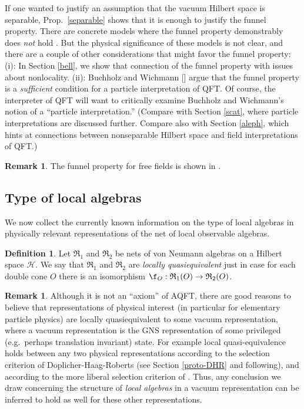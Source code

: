 \documentclass[12pt]{article}
\newcommand{\alg}[1]{\mathfrak{#1}}
\theoremstyle{definition}
\theoremstyle{definition}
\newtheorem{defn}[thm]{Definition}
\newtheorem{note}[thm]{Remark}
\theoremstyle{remark}
\def\2#1{{\mathcal #1}}
\begin{document}
If one wanted to justify an assumption that the vacuum
Hilbert space is separable, Prop.\ \ref{separable}
shows that it is enough to justify the funnel property.
There are concrete models where the funnel property
demonstrably does \emph{not} hold \cite[p.\
23]{horuzhy}.  But the physical significance of these
models is not clear, and there are a couple of other
considerations that might favor the funnel property:
(i): In Section \ref{bell}, we show that connection of
the funnel property with issues about nonlocality.
(ii): Buchholz and Wichmann [\citeyear{bucwic}] argue
that the funnel property is a \emph{sufficient}
condition for a particle interpretation of QFT.  Of
course, the interpreter of QFT will want to critically
examine Buchholz and Wichmann's notion of a ``particle
interpretation.'' (Compare with Section \ref{scat},
where particle interpretations are discussed further.
Compare also with Section \ref{aleph}, which hints at
connections between nonseparable Hilbert space and
field interpretations of QFT.)


\begin{note} The funnel property for free fields is shown in
  \cite{pstates}.
\end{note}


\subsection{Type of local algebras} \label{type-loc}

We now collect the currently known information on the type of local algebras in
physically relevant representations of the net of local observable algebras.

\begin{defn} Let $\alg{R}_1$ and $\alg{R}_2$ be nets of von Neumann algebras on a
  Hilbert space $\2H$.  We say that $\alg{R}_1$ and $\alg{R}_2$ are \emph{locally
    quasiequivalent} just in case for each double cone $O$ there is an isomorphism
  $\f _O:\alg{R}_1(O)\to \alg{R}_2(O)$.  \end{defn}

\begin{note} Although it is not an ``axiom'' of AQFT, there are good
  reasons to believe that representations of physical interest (in
  particular for elementary particle physics) are locally
  quasiequivalent to some vacuum representation, where a vacuum
  representation is the GNS representation of some privileged (e.g.\
  perhaps translation invariant) state.  For example local
  quasi-equivalence holds between any two physical representations
  according to the selection criterion of Doplicher-Haag-Roberts (see
  Section \ref{proto-DHR} and following), and according to the more
  liberal selection criterion of \cite{buch-fred}.  Thus, any
  conclusion we draw concerning the structure of \emph{local algebras}
  in a vacuum representation can be inferred to hold as well for these
  other representations.
\end{note}
\end{document}

